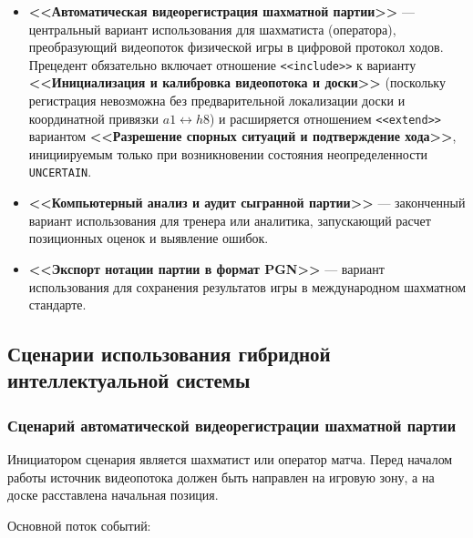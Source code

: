\begin{itemize}
    \item \textbf{<<Автоматическая видеорегистрация шахматной партии>>} --- центральный вариант использования для шахматиста (оператора), преобразующий видеопоток физической игры в цифровой протокол ходов. Прецедент обязательно включает отношение \texttt{<<include>>} к варианту \textbf{<<Инициализация и калибровка видеопотока и доски>>} (поскольку регистрация невозможна без предварительной локализации доски и координатной привязки $a1 \leftrightarrow h8$) и расширяется отношением \texttt{<<extend>>} вариантом \textbf{<<Разрешение спорных ситуаций и подтверждение хода>>}, инициируемым только при возникновении состояния неопределенности \texttt{UNCERTAIN}.
    \item \textbf{<<Компьютерный анализ и аудит сыгранной партии>>} --- законченный вариант использования для тренера или аналитика, запускающий расчет позиционных оценок и выявление ошибок.
    \item \textbf{<<Экспорт нотации партии в формат PGN>>} --- вариант использования для сохранения результатов игры в международном шахматном стандарте.
\end{itemize}

\subsection{Сценарии использования гибридной интеллектуальной системы}

\subsubsection{Сценарий автоматической видеорегистрации шахматной партии}

Инициатором сценария является шахматист или оператор матча. Перед началом работы источник видеопотока должен быть направлен на игровую зону, а на доске расставлена начальная позиция. 

Основной поток событий:

